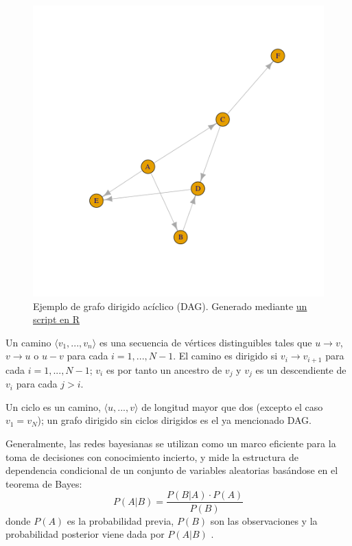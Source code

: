 \begin{figure}[h!]
    \centering
     \includegraphics[width=\textwidth]{./img/dag.png}
     \caption{Ejemplo de grafo dirigido acíclico (DAG). Generado mediante \href{https://github.com/ElenaMerelo/TFG/blob/master/scripts/dag.R}{un script en R}}
     \label{img:dag1}
    \end{figure}

Un camino $ \langle v_{1},...,v_{n} \rangle $ 
es una secuencia de vértices distinguibles tales que $u \rightarrow v$, $v \rightarrow u$ o $u - v$ para 
cada $i= 1,..., N-1$. El camino es dirigido si $v_{i} \rightarrow v_{i+1}$ 
para cada $i= 1,..., N-1$; $v_{i}$ es por tanto un ancestro de $v_{j}$ y $v_{j}$ es un descendiente de 
$v_{i}$ para cada $j > i$. 

Un ciclo es un camino, $\langle u,...,v \rangle$ de longitud mayor que dos 
(excepto el caso $v_{1} = v_{N}$); un grafo 
dirigido sin ciclos dirigidos es el ya mencionado DAG. 

Generalmente, las redes bayesianas se utilizan como un marco eficiente para la
toma de decisiones con conocimiento incierto, y mide la estructura de dependencia condicional
de un conjunto de variables aleatorias basándose en el teorema de Bayes:\\
\begin{equation} \label{eq:bayes}
P(A|B) = \frac{P(B|A) \cdot P(A)}{P(B)}
\end{equation}
donde $P(A)$ es la probabilidad previa, $P(B)$ son las observaciones y la probabilidad posterior viene dada 
por $P(A|B)$ \cite{YANG201919}.

